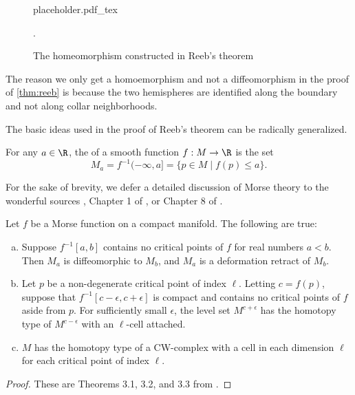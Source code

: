 \begin{figure}[ht]
	{placeholder.pdf_tex}
	\caption{The homeomorphism constructed in Reeb's theorem}.
\end{figure}

\begin{remark}
	The reason we only get a homoemorphism and not a diffeomorphism in the proof of \cref{thm:reeb} is because the two hemispheres are identified along the boundary and not along collar neighborhoods.
\end{remark}

The basic ideas used in the proof of Reeb's theorem can be radically generalized.

\begin{definition}
	For any $a\in \R$, the  of a smooth function $f : M \to \R$ is the set
	\begin{equation}
		M_a = f^{-1}(-\infty, a] = \{ p\in M \mid f(p)\leq a\}.
	\end{equation}
\end{definition}

For the sake of brevity, we defer a detailed discussion of Morse theory to the wonderful sources \cite{milnor1963morse}, Chapter 1 of \cite{scorpan2005wild}, or Chapter 8 of \cite{hirsch1976differential}.

\begin{theorem}
	Let $f$ be a Morse function on a compact manifold. The following are true:
	\begin{enumerate}[(a)]
		\item Suppose $f^{-1}[a,b]$ contains no critical points of $f$ for real numbers $a<b$. Then $M_a$ is diffeomorphic to $M_b$, and $M_a$ is a deformation retract of $M_b$.
		\item Let $p$ be a non-degenerate critical point of index $\ell$. Letting $c=f(p)$, suppose that $f^{-1}[c-\epsilon, c+\epsilon]$ is compact and contains no critical points of $f$ aside from $p$. For sufficiently small $\epsilon$, the level set $M^{c+\epsilon}$ has the homotopy type of $M^{c-\epsilon}$ with an $\ell$-cell attached.
		\item $M$ has the homotopy type of a CW-complex with a cell in each dimension $\ell$ for each critical point of index $\ell$.
	\end{enumerate}
\end{theorem}
\begin{proof}
	These are Theorems 3.1, 3.2, and 3.3 from \cite{milnor1963morse}.
\end{proof}

